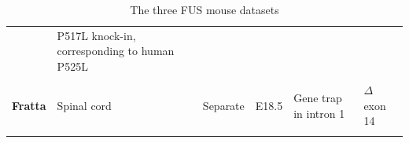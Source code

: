 \begin{longtable}[]{@{}llllll@{}}
\begin{minipage}[t]{0.16\columnwidth}
		{ \footnotesize\citep{Hicks2000} }\strut
	\end{minipage} & \begin{minipage}[t]{0.16\columnwidth}\raggedright\strut
		{P517L knock-in,}
		{corresponding to human P525L}
		{\footnotesize\citep{Conte2012}}\strut
	\end{minipage}\tabularnewline \\
	\begin{minipage}[t]{0.16\columnwidth}\raggedright\strut
		{\textbf{Fratta}}\strut
	\end{minipage} & \begin{minipage}[t]{0.14\columnwidth}\raggedright\strut
		{Spinal cord}\strut
	\end{minipage} & \begin{minipage}[t]{0.12\columnwidth}\raggedright\strut
		{Separate}\strut
	\end{minipage} & \begin{minipage}[t]{0.10\columnwidth}\raggedright\strut
		{E18.5}\strut
	\end{minipage} & \begin{minipage}[t]{0.16\columnwidth}\raggedright\strut
		{Gene trap in intron 1}\strut
	\end{minipage} & \begin{minipage}[t]{0.16\columnwidth}\raggedright\strut
		{$\Delta$ exon 14 }
		{\footnotesize\citep{Devoy2017}}  \strut
	\end{minipage}\tabularnewline
	\caption{The three FUS mouse datasets}
	\label{tab:fus_datasets}
\end{longtable}


